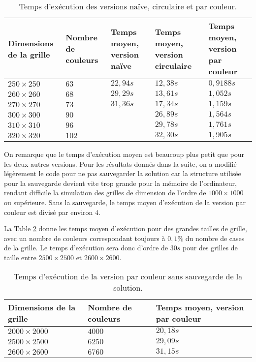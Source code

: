 \documentclass[a4paper,12pt]{article}
\numberwithin{equation}{section}
\begin{document}
\begin{table}[ht]
\centering
\begin{tabular}{>{\centering} m{} >{\centering} m{} >{\centering} m{} >{\centering} m{} >{\centering} m{}}
\hline\hline
Dimensions de la grille & Nombre de couleurs & Temps moyen, version naïve & Temps moyen, version circulaire & Temps moyen, version par couleur \tabularnewline
\hline
$250 \times 250$ &  $63$ & $22,94 s$ & $12,38 s$ & $0,9188 s$ \tabularnewline
$260 \times 260$ &  $68$ & $29,29 s$ & $13,61 s$ & $1,052 s$  \tabularnewline
$270 \times 270$ &  $73$ & $31,36 s$ & $17,34 s$ & $1,159 s$  \tabularnewline
$300 \times 300$ &  $90$ &           & $26,89 s$ & $1,564 s$  \tabularnewline
$310 \times 310$ &  $96$ &           & $29,78 s$ & $1,761 s$  \tabularnewline
$320 \times 320$ & $102$ &           & $32,30 s$ & $1,905 s$  \tabularnewline
\hline\hline
\end{tabular}
\caption{Temps d'exécution des versions naïve, circulaire et par couleur.}
\label{TempsCouleurProp1}
\end{table}

On remarque que le temps d'exécution moyen est beaucoup plus petit que pour les deux autres versions. Pour les résultats donnés dans la suite, on a modifié légèrement le code pour ne pas sauvegarder la solution car la structure utilisée pour la sauvegarde devient vite trop grande pour la mémoire de l'ordinateur, rendant difficile la simulation des grilles de dimension de l'ordre de $1000 \times 1000$ ou supérieure. Sans la sauvegarde, le temps moyen d'exécution de la version par couleur est divisé par environ 4.

La Table \ref{TempsCouleurProp2} donne les temps moyen d'exécution pour des grandes tailles de grille, avec un nombre de couleurs correspondant toujours à $0,1\%$ du nombre de cases de la grille. Le temps d'exécution sera donc d'ordre de $30 s$ pour des grilles de taille entre $2500 \times 2500$ et $2600 \times 2600$.

\begin{table}[ht]
\centering
\begin{tabular}{>{\centering} m{} >{\centering} m{} >{\centering} m{}}
\hline\hline
Dimensions de la grille & Nombre de couleurs & Temps moyen, version par couleur \tabularnewline
\hline
$2000 \times 2000$ & $4000$ & $20,18 s$ \tabularnewline
$2500 \times 2500$ & $6250$ & $29,09 s$ \tabularnewline
$2600 \times 2600$ & $6760$ & $31,15 s$ \tabularnewline
\hline\hline
\end{tabular}
\caption{Temps d'exécution de la version par couleur sans sauvegarde de la solution.}
\label{TempsCouleurProp2}
\end{table}
\end{document}
